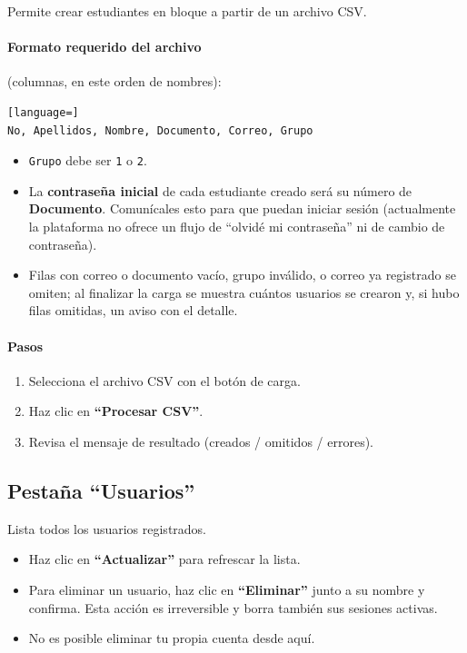 \documentclass[11pt,a4paper]{article}
\newcommand{\code}[1]{\texttt{#1}}
\begin{document}
Permite crear estudiantes en bloque a partir de un archivo CSV.

\paragraph{Formato requerido del archivo} (columnas, en este orden de nombres):

\begin{lstlisting}[language=]
No, Apellidos, Nombre, Documento, Correo, Grupo
\end{lstlisting}

\begin{itemize}
  \item \code{Grupo} debe ser \code{1} o \code{2}.
  \item La \textbf{contraseña inicial} de cada estudiante creado será su número de \textbf{Documento}. Comunícales esto para que puedan iniciar sesión (actualmente la plataforma no ofrece un flujo de ``olvidé mi contraseña'' ni de cambio de contraseña).
  \item Filas con correo o documento vacío, grupo inválido, o correo ya registrado se omiten; al finalizar la carga se muestra cuántos usuarios se crearon y, si hubo filas omitidas, un aviso con el detalle.
\end{itemize}

\paragraph{Pasos}
\begin{enumerate}
  \item Selecciona el archivo CSV con el botón de carga.
  \item Haz clic en \textbf{``Procesar CSV''}.
  \item Revisa el mensaje de resultado (creados / omitidos / errores).
\end{enumerate}

\subsection{Pestaña ``Usuarios''}

Lista todos los usuarios registrados.

\begin{itemize}
  \item Haz clic en \textbf{``Actualizar''} para refrescar la lista.
  \item Para eliminar un usuario, haz clic en \textbf{``Eliminar''} junto a su nombre y confirma. Esta acción es irreversible y borra también sus sesiones activas.
  \item No es posible eliminar tu propia cuenta desde aquí.
\end{itemize}
\end{document}
